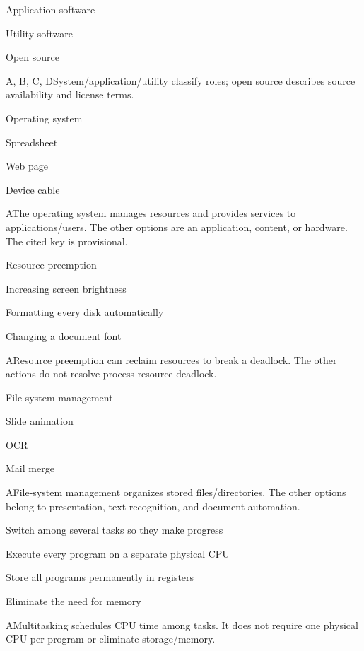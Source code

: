 \begin{enumerate}[label=\textbf{Q\arabic*.}, leftmargin=*]
{   \item Application software
   \item Utility software
   \item Open source}
  {A, B, C, D}{System/application/utility classify roles; open source describes source availability and license terms.}
\fi
\ifnum{}
  {\item Operating system
   \item Spreadsheet
   \item Web page
   \item Device cable}
  {A}{The operating system manages resources and provides services to applications/users. The other options are an application, content, or hardware. The cited key is provisional.}
  {\item Resource preemption
   \item Increasing screen brightness
   \item Formatting every disk automatically
   \item Changing a document font}
  {A}{Resource preemption can reclaim resources to break a deadlock. The other actions do not resolve process-resource deadlock.}
  {\item File-system management
   \item Slide animation
   \item OCR
   \item Mail merge}
  {A}{File-system management organizes stored files/directories. The other options belong to presentation, text recognition, and document automation.}
  {\item Switch among several tasks so they make progress
   \item Execute every program on a separate physical CPU
   \item Store all programs permanently in registers
   \item Eliminate the need for memory}
  {A}{Multitasking schedules CPU time among tasks. It does not require one physical CPU per program or eliminate storage/memory.}

\end{enumerate}
